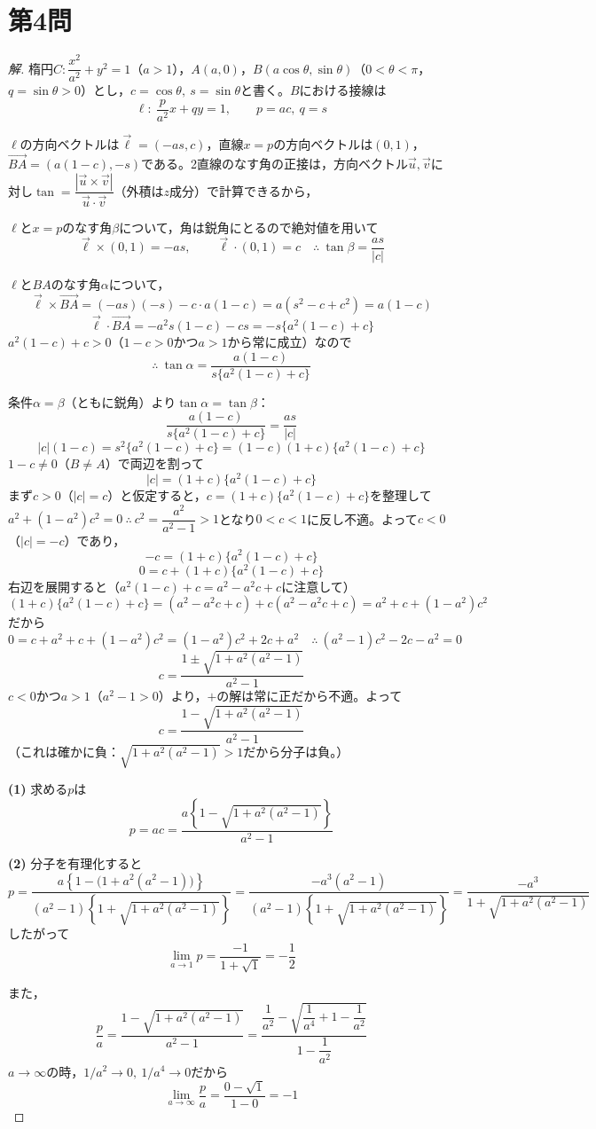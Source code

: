 \documentclass[../main.tex]{subfiles}
\begin{document}
\newpage

\section*{第4問}

\begin{proof}[解]
  楕円$C:\dfrac{x^2}{a^2}+y^2=1$（$a>1$），$A(a,0)$，$B(a\cos\theta,\sin\theta)$（$0<\theta<\pi$，$q=\sin\theta>0$）とし，$c=\cos\theta,\ s=\sin\theta$と書く。$B$における接線は
  \[
    \ell:\ \frac{p}{a^2}x+qy=1,\qquad p=ac,\ q=s
  \]

  $\ell$の方向ベクトルは$\vec\ell=(-as,c)$，直線$x=p$の方向ベクトルは$(0,1)$，$\overrightarrow{BA}=(a(1-c),-s)$である。2直線のなす角の正接は，方向ベクトル$\vec u,\vec v$に対し$\tan=\dfrac{|\vec u\times\vec v|}{\vec u\cdot\vec v}$（外積は$z$成分）で計算できるから，

  $\ell$と$x=p$のなす角$\beta$について，角は鋭角にとるので絶対値を用いて
  \[
    \vec\ell\times(0,1)=-as,\qquad \vec\ell\cdot(0,1)=c \quad\therefore\ \tan\beta=\frac{as}{|c|}
  \]

  $\ell$と$BA$のなす角$\alpha$について，
  \[
    \vec\ell\times\overrightarrow{BA}=(-as)(-s)-c\cdot a(1-c)=a(s^2-c+c^2)=a(1-c)
  \]
  \[
    \vec\ell\cdot\overrightarrow{BA}=-a^2s(1-c)-cs=-s\{a^2(1-c)+c\}
  \]
  $a^2(1-c)+c>0$（$1-c>0$かつ$a>1$から常に成立）なので
  \[
    \therefore\ \tan\alpha=\frac{a(1-c)}{s\{a^2(1-c)+c\}}
  \]

  条件$\alpha=\beta$（ともに鋭角）より$\tan\alpha=\tan\beta$：
  \[
    \frac{a(1-c)}{s\{a^2(1-c)+c\}}=\frac{as}{|c|}
  \]
  \[
    |c|(1-c)=s^2\{a^2(1-c)+c\}=(1-c)(1+c)\{a^2(1-c)+c\}
  \]
  $1-c\ne0$（$B\ne A$）で両辺を割って
  \[
    |c|=(1+c)\{a^2(1-c)+c\}
  \]
  まず$c>0$（$|c|=c$）と仮定すると，$c=(1+c)\{a^2(1-c)+c\}$を整理して$a^2+(1-a^2)c^2=0\ \therefore\ c^2=\dfrac{a^2}{a^2-1}>1$となり$0<c<1$に反し不適。よって$c<0$（$|c|=-c$）であり，
  \[
    -c=(1+c)\{a^2(1-c)+c\}
  \]
  \[
    0=c+(1+c)\{a^2(1-c)+c\}
  \]
  右辺を展開すると（$a^2(1-c)+c=a^2-a^2c+c$に注意して）
  \[
    (1+c)\{a^2(1-c)+c\}=(a^2-a^2c+c)+c(a^2-a^2c+c)=a^2+c+(1-a^2)c^2
  \]
  だから
  \[
    0=c+a^2+c+(1-a^2)c^2=(1-a^2)c^2+2c+a^2 \quad\therefore\ (a^2-1)c^2-2c-a^2=0
  \]
  \[
    c=\frac{1\pm\sqrt{1+a^2(a^2-1)}}{a^2-1}
  \]
  $c<0$かつ$a>1$（$a^2-1>0$）より，$+$の解は常に正だから不適。よって
  \[
    c=\frac{1-\sqrt{1+a^2(a^2-1)}}{a^2-1}
  \]
  （これは確かに負：$\sqrt{1+a^2(a^2-1)}>1$だから分子は負。）

  \textbf{(1)} 求める$p$は
  \[
    p=ac=\frac{a\left\{1-\sqrt{1+a^2(a^2-1)}\right\}}{a^2-1}
  \]

  \textbf{(2)} 分子を有理化すると
  \[
    p=\frac{a\left\{1-\bigl(1+a^2(a^2-1)\bigr)\right\}}{(a^2-1)\left\{1+\sqrt{1+a^2(a^2-1)}\right\}}=\frac{-a^3(a^2-1)}{(a^2-1)\left\{1+\sqrt{1+a^2(a^2-1)}\right\}}=\frac{-a^3}{1+\sqrt{1+a^2(a^2-1)}}
  \]
  したがって
  \[
    \lim_{a\to1}p=\frac{-1}{1+\sqrt1}=-\frac12
  \]

  また，
  \[
    \frac pa=\frac{1-\sqrt{1+a^2(a^2-1)}}{a^2-1}=\frac{\dfrac1{a^2}-\sqrt{\dfrac1{a^4}+1-\dfrac1{a^2}}}{1-\dfrac1{a^2}}
  \]
  $a\to\infty$の時，$1/a^2\to0,\ 1/a^4\to0$だから
  \[
    \lim_{a\to\infty}\frac pa=\frac{0-\sqrt1}{1-0}=-1
  \]
\end{proof}
\end{document}
